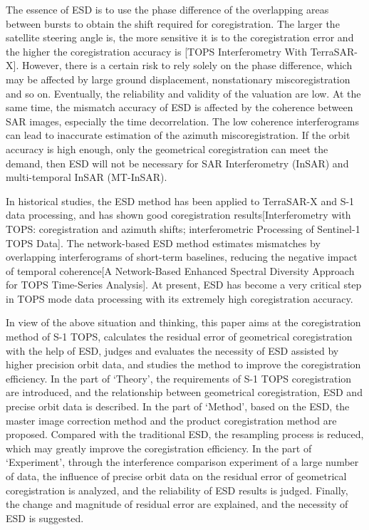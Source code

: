 \documentclass[a4paper,fleqn]{cas-dc}
\begin{document}
The essence of ESD is to use the phase difference of the overlapping areas between bursts to obtain the shift required for coregistration. The larger the satellite steering angle is, the more sensitive it is to the coregistration error and the higher the coregistration accuracy is [TOPS Interferometry With TerraSAR-X]. However, there is a certain risk to rely solely on the phase difference, which may be affected by large ground displacement, nonstationary miscoregistration and so on. Eventually, the reliability and validity of the valuation are low. At the same time, the mismatch accuracy of ESD is affected by the coherence between SAR images, especially the time decorrelation. The low coherence interferograms can lead to inaccurate estimation of the azimuth miscoregistration. If the orbit accuracy is high enough, only the geometrical coregistration can meet the demand, then ESD will not be necessary for SAR Interferometry (InSAR) and multi-temporal InSAR (MT-InSAR). \par
In historical studies, the ESD method has been applied to TerraSAR-X and S-1 data processing, and has shown good coregistration results[Interferometry with TOPS: coregistration and azimuth shifts; interferometric Processing of Sentinel-1 TOPS Data]. The network-based ESD method estimates mismatches by overlapping interferograms of short-term baselines, reducing the negative impact of temporal coherence[A Network-Based Enhanced Spectral Diversity Approach for TOPS Time-Series Analysis]. At present, ESD has become a very critical step in TOPS mode data processing with its extremely high coregistration accuracy. \par
In view of the above situation and thinking, this paper aims at the coregistration method of S-1 TOPS, calculates the residual error of geometrical coregistration with the help of ESD, judges and evaluates the necessity of ESD assisted by higher precision orbit data, and studies the method to improve the coregistration efficiency. In the part of ‘Theory’, the requirements of S-1 TOPS coregistration are introduced, and the relationship between geometrical coregistration, ESD and precise orbit data is described. In the part of ‘Method’, based on the ESD, the master image correction method and the product coregistration method are proposed. Compared with the traditional ESD, the resampling process is reduced, which may greatly improve the coregistration efficiency. In the part of ‘Experiment’, through the interference comparison experiment of a large number of data, the influence of precise orbit data on the residual error of geometrical coregistration is analyzed, and the reliability of ESD results is judged. Finally, the change and magnitude of residual error are explained, and the necessity of ESD is suggested. \par
\end{document}
